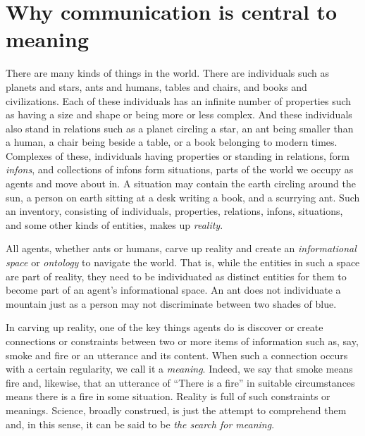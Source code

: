 \chapter{Why communication is central to meaning} \label{ch:why communication is central}


There are many kinds of things in the world. There are individuals such as planets and stars, ants and humans, tables and chairs, and books and civilizations. Each of these individuals has an infinite number of properties such as having a size and shape or being more or less complex. And these individuals also stand in relations such as a planet circling a star, an ant being smaller than a human, a chair being beside a table, or a book belonging to modern times. Complexes of these, individuals having properties or standing in relations, form \emph{infons}, and collections of infons form situations, parts of the world we occupy as agents and move about in. A situation may contain the earth circling around the sun, a person on earth sitting at a desk writing a book, and a scurrying ant. Such an inventory, consisting of individuals, properties, relations, infons, situations, and some other kinds of entities, makes up \emph{reality}.


All agents, whether ants or humans, carve up reality and create an \emph{informational space} or \emph{ontology} to navigate the world. That is, while the entities in such a space are part of reality, they need to be individuated as distinct entities for them to become part of an agent's informational space. An ant does not individuate a mountain just as a person may not discriminate between two shades of blue.

In carving up reality, one of the key things agents do is discover or create connections or constraints between two or more items of information such as, say, smoke and fire or an utterance and its content. When such a connection occurs with a certain regularity, we call it a \emph{meaning}. Indeed, we say that smoke means fire and, likewise, that an utterance of ``There is a fire'' in suitable circumstances means there is a fire in some situation. Reality is full of such constraints or meanings. Science, broadly construed, is just the attempt to comprehend them and, in this sense, it can be said to be \emph{the search for meaning}.


